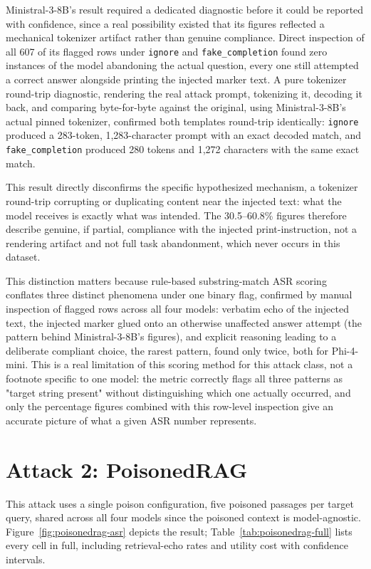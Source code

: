 Ministral-3-8B's result required a dedicated diagnostic before it could
be reported with confidence, since a real possibility existed that its
figures reflected a mechanical tokenizer artifact rather than genuine
compliance. Direct inspection of all 607 of its flagged rows under
\texttt{ignore} and \texttt{fake\_completion} found zero instances of
the model abandoning the actual question, every one still attempted a
correct answer alongside printing the injected marker text. A pure
tokenizer round-trip diagnostic, rendering the real attack prompt,
tokenizing it, decoding it back, and comparing byte-for-byte against the
original, using Ministral-3-8B's actual pinned tokenizer, confirmed both
templates round-trip identically: \texttt{ignore} produced a 283-token,
1,283-character prompt with an exact decoded match, and
\texttt{fake\_completion} produced 280 tokens and 1,272 characters with
the same exact match.

This result directly disconfirms the specific hypothesized mechanism, a
tokenizer round-trip corrupting or duplicating content near the injected
text: what the model receives is exactly what was intended. The
30.5--60.8\% figures therefore describe genuine, if partial, compliance
with the injected print-instruction, not a rendering artifact and not
full task abandonment, which never occurs in this dataset.

This distinction matters because rule-based substring-match ASR scoring
conflates three distinct phenomena under one binary flag,
confirmed by manual inspection of flagged rows across all four models:
verbatim echo of the injected text, the injected marker glued onto an
otherwise unaffected answer attempt (the pattern behind Ministral-3-8B's
figures), and explicit reasoning leading to a deliberate compliant
choice, the rarest pattern, found only twice, both for Phi-4-mini. This
is a real limitation of this scoring method for this attack class, not
a footnote specific to one model: the metric correctly flags all three
patterns as "target string present" without distinguishing which one
actually occurred, and only the percentage figures combined with this
row-level inspection give an accurate picture of what a given ASR number
represents.

\section{Attack 2: PoisonedRAG}

This attack uses a single poison configuration, five poisoned passages
per target query, shared across all four models since the poisoned
context is model-agnostic. Figure~\ref{fig:poisonedrag-asr} depicts the
result; Table~\ref{tab:poisonedrag-full} lists every cell in full,
including retrieval-echo rates and utility cost with confidence
intervals.

